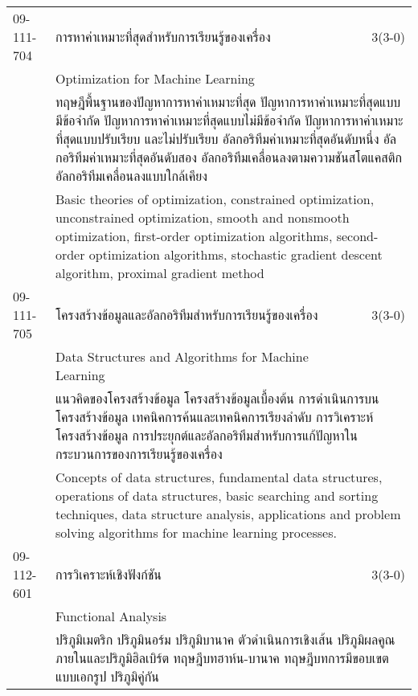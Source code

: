 \begin{longtable}{p{}p{}r{}}
09-111-704 & การหาค่าเหมาะที่สุดสำหรับการเรียนรู้ของเครื่อง & 3(3-0)\\*
 & Optimization for Machine Learning & \phantom{x} \vspace{3mm} \\*
&  \multicolumn{2}{p{0.75\textwidth}}{ทฤษฎีพื้นฐานของปัญหาการหาค่าเหมาะที่สุด ปัญหาการหาค่าเหมาะที่สุดแบบมีข้อจำกัด ปัญหาการหาค่าเหมาะที่สุดแบบไม่มีข้อจำกัด ปัญหาการหาค่าเหมาะที่สุดแบบปรับเรียบ และไม่ปรับเรียบ อัลกอริทึมค่าเหมาะที่สุดอันดับหนึ่ง อัลกอริทึมค่าเหมาะที่สุดอันดับสอง อัลกอริทึมเคลื่อนลงตามความชันสโตแคสติก อัลกอริทึมเคลื่อนลงแบบใกล้เคียง} \vspace{3mm} \\*
&  \multicolumn{2}{p{0.75\textwidth}}{Basic theories of optimization, constrained optimization, unconstrained optimization, smooth and nonsmooth optimization, first-order optimization algorithms, second-order optimization algorithms, stochastic gradient descent algorithm, proximal gradient method} \vspace{8mm} \\*
09-111-705 & โครงสร้างข้อมูลและอัลกอริทึมสำหรับการเรียนรู้ของเครื่อง & 3(3-0)\\*
 & Data Structures and Algorithms for Machine Learning & \phantom{x} \vspace{3mm} \\*
&  \multicolumn{2}{p{0.75\textwidth}}{แนวคิดของโครงสร้างข้อมูล โครงสร้างข้อมูลเบื้องต้น การดำเนินการบนโครงสร้างข้อมูล เทคนิคการค้นและเทคนิคการเรียงลำดับ การวิเคราะห์โครงสร้างข้อมูล การประยุกต์และอัลกอริทึมสำหรับการแก้ปัญหาในกระบวนการของการเรียนรู้ของเครื่อง} \vspace{3mm} \\*
&  \multicolumn{2}{p{0.75\textwidth}}{Concepts of data structures, fundamental data structures, operations of data structures, basic searching and sorting techniques, data structure analysis, applications and problem solving algorithms for machine learning processes.} \vspace{8mm} \\*
09-112-601 & การวิเคราะห์เชิงฟังก์ชัน & 3(3-0)\\*
 & Functional Analysis & \phantom{x} \vspace{3mm} \\*
&  \multicolumn{2}{p{0.75\textwidth}}{ปริภูมิเมตริก ปริภูมินอร์ม ปริภูมิบานาค ตัวดำเนินการเชิงเส้น ปริภูมิผลคูณภายในและปริภูมิฮิลเบิร์ต ทฤษฎีบทฮาห์น-บานาค ทฤษฎีบทการมีขอบเขตแบบเอกรูป ปริภูมิคู่กัน} \vspace{3mm} \\*

\end{longtable}
